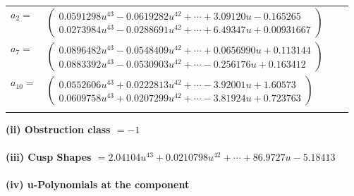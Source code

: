 \documentclass[1p]{elsarticle_modified}
\theoremstyle{definition}
\begin{document}
\begin{tabular}{m{7pt} m{180pt} m{7pt} m{180pt} }
\flushright $a_{2}=$&$\begin{pmatrix}0.0591298 u^{43}-0.0619282 u^{42}+\cdots+3.09120 u-0.165265\\0.0273984 u^{43}-0.0288691 u^{42}+\cdots+6.49347 u+0.00931667\end{pmatrix}$ \\
\flushright $a_{7}=$&$\begin{pmatrix}0.0896482 u^{43}-0.0548409 u^{42}+\cdots+0.0656990 u+0.113144\\0.0883392 u^{43}-0.0530903 u^{42}+\cdots-0.256176 u+0.163412\end{pmatrix}$ \\
\flushright $a_{10}=$&$\begin{pmatrix}0.0552606 u^{43}+0.0222813 u^{42}+\cdots-3.92001 u+1.60573\\0.0609758 u^{43}+0.0207299 u^{42}+\cdots-3.81924 u+0.723763\end{pmatrix}$\\&\end{tabular}
\flushleft \textbf{(ii) Obstruction class $= -1$}\\~\\
\flushleft \textbf{(iii) Cusp Shapes $= 2.04104 u^{43}+0.0210798 u^{42}+\cdots+86.9727 u-5.18413$}\\~\\
\newpage\renewcommand{\arraystretch}{1}
\flushleft \textbf{(iv) u-Polynomials at the component}\newline \\
\end{document}
